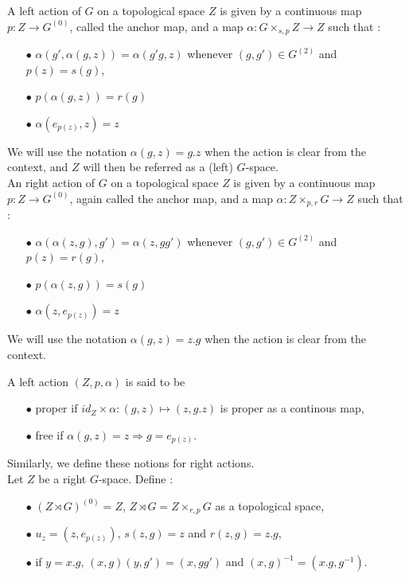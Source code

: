 \begin{definition}
A left action of $G$ on a topological space $Z$ is given by a continuous map $p : Z \rightarrow G^{(0)}$, called the anchor map, and a map $\alpha : G\times_{s,p} Z \rightarrow Z $ such that :
\begin{itemize}
\item[$\bullet$] $\alpha(g',\alpha(g,z)) = \alpha(g'g,z)$ whenever $(g,g')\in G^{(2)}$ and $p(z)=s(g)$,
\item[$\bullet$] $p(\alpha(g,z))= r(g)$
\item[$\bullet$] $\alpha(e_{p(z)},z)=z$
\end{itemize} 
We will use the notation $\alpha(g,z) = g.z$ when the action is clear from the context, and $Z$ will then be referred as a (left) $G$-space.\\

An right action of $G$ on a topological space $Z$ is given by a continuous map $p : Z \rightarrow G^{(0)}$, again called the anchor map, and a map $\alpha : Z\times_{p,r} G \rightarrow Z $ such that :
\begin{itemize}
\item[$\bullet$] $\alpha(\alpha(z,g),g') = \alpha(z, gg')$ whenever $(g,g')\in G^{(2)}$ and $p(z)=r(g)$,
\item[$\bullet$] $p(\alpha(z,g))= s(g)$
\item[$\bullet$] $\alpha(z,e_{p(z)})=z$
\end{itemize} We will use the notation $\alpha(g,z) = z.g$ when the action is clear from the context.\\ 
\end{definition}

A left action $(Z,p,\alpha)$ is said to be 
\begin{itemize}
\item[$\bullet$] proper if $id_Z \times \alpha : (g,z) \mapsto (z,g.z) $ is proper as a continous map,
\item[$\bullet$] free if $\alpha(g,z)=z \Rightarrow g=e_{p(z)} $.
\end{itemize}
Similarly, we define these notions for right actions.\\

Let $Z$ be a right $G$-space. Define :
\begin{itemize}
\item[$\bullet$] $(Z\rtimes G)^{(0)} = Z$, $Z\rtimes G = Z\times_{r,p} G$ as a topological space,
\item[$\bullet$] $u_{z}= (z,e_{p(z)})$, $ s(z,g) = z$ and $r(z,g)=z.g$, 
\item[$\bullet$] if $y = x.g$, $(x,g)(y,g')= (x,gg') $ and $(x,g)^{-1} = (x.g,g^{-1})$.
\end{itemize}


